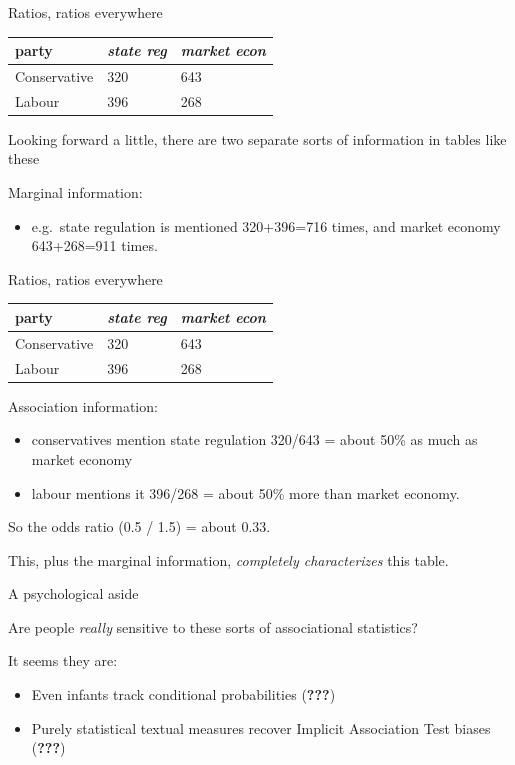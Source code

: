\documentclass{hertieteaching}
\begin{document}
\begin{frame}{Ratios, ratios everywhere}
\protect\hypertarget{ratios-ratios-everywhere}{}

\begin{longtable}[]{@{}lll@{}}
\toprule
party & \emph{state reg} & \emph{market econ}\tabularnewline
\midrule
\endhead
Conservative & 320 & 643\tabularnewline
Labour & 396 & 268\tabularnewline
\bottomrule
\end{longtable}

Looking forward a little, there are two separate sorts of information in
tables like these

Marginal information:

\begin{itemize}
\item
  e.g.~state regulation is mentioned 320+396=716 times, and market
  economy 643+268=911 times.
\end{itemize}

\end{frame}

\begin{frame}{Ratios, ratios everywhere}
\protect\hypertarget{ratios-ratios-everywhere-1}{}

\begin{longtable}[]{@{}lll@{}}
\toprule
party & \emph{state reg} & \emph{market econ}\tabularnewline
\midrule
\endhead
Conservative & 320 & 643\tabularnewline
Labour & 396 & 268\tabularnewline
\bottomrule
\end{longtable}

Association information:

\begin{itemize}
\item
  conservatives mention state regulation 320/643 = about 50\% as much as
  market economy\item
  labour mentions it 396/268 = about 50\% more than market economy.
\end{itemize}

So the odds ratio (0.5 / 1.5) = about 0.33.

This, plus the marginal information, \emph{completely characterizes}
this table.

\end{frame}

\begin{frame}{A psychological aside}
\protect\hypertarget{a-psychological-aside}{}

Are people \emph{really} sensitive to these sorts of associational
statistics?

\pause

It seems they are:

\begin{itemize}
\item
  Even infants track conditional probabilities ({\textbf{???}})\item
  Purely statistical textual measures recover Implicit Association Test
  biases ({\textbf{???}})
\end{itemize}

\end{frame}
\end{document}
